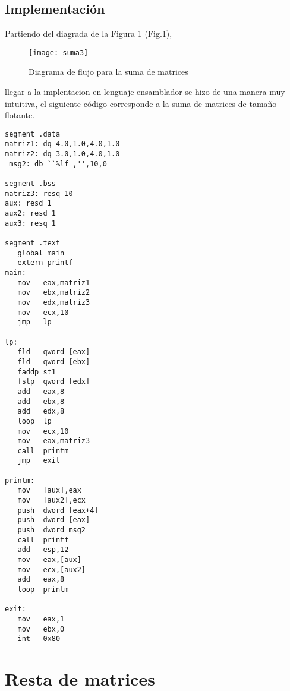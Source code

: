 \documentclass[conference]{IEEEtran}
\begin{document}
\subsection{Implementaci\'on}
Partiendo del diagrada de la Figura 1 (Fig.1),
\begin{figure}[!h]
\centering
\texttt{[image: suma3]}
\caption{Diagrama de flujo para la suma de matrices}
\label{fig_sim}
\end{figure}
\vspace{0.1in}
llegar a la implentacion en lenguaje ensamblador se hizo de una manera muy intuitiva,
el siguiente c\'odigo corresponde a la suma de matrices de tamaño flotante.
\begin{lstlisting}[language={[x86masm]Assembler}]
segment .data
matriz1: dq 4.0,1.0,4.0,1.0
matriz2: dq 3.0,1.0,4.0,1.0
 msg2: db ``%lf ,'',10,0

segment .bss
matriz3: resq 10
aux: resd 1
aux2: resd 1
aux3: resq 1

segment .text
   global main
   extern printf
main:
   mov   eax,matriz1
   mov   ebx,matriz2
   mov   edx,matriz3
   mov   ecx,10
   jmp   lp

lp:
   fld   qword [eax]
   fld   qword [ebx]
   faddp st1
   fstp  qword [edx]
   add   eax,8
   add   ebx,8
   add   edx,8
   loop  lp
   mov   ecx,10
   mov   eax,matriz3
   call  printm
   jmp   exit

printm:
   mov   [aux],eax
   mov   [aux2],ecx
   push  dword [eax+4]
   push  dword [eax]
   push  dword msg2
   call  printf
   add   esp,12
   mov   eax,[aux]
   mov   ecx,[aux2]
   add   eax,8
   loop  printm

exit:
   mov   eax,1
   mov   ebx,0
   int   0x80
\end{lstlisting}
\section{Resta de matrices}


\end{document}
